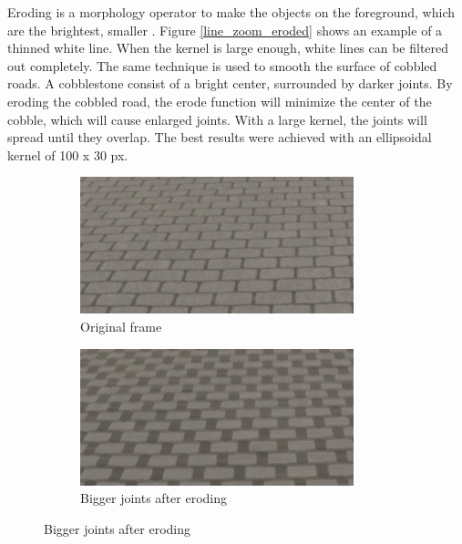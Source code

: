 \documentclass[runningheads,a4paper]{llncs}
\begin{document}
Eroding is a morphology operator to make the objects on the foreground, which are the brightest, smaller \cite{erode_dilate}. Figure \ref{line_zoom_eroded} shows an example of a thinned white line. When the kernel is large enough, white lines can be filtered out completely. The same technique is used to smooth the surface of cobbled roads. A cobblestone consist of a bright center, surrounded by darker joints. By eroding the cobbled road, the erode function will minimize the center of the cobble, which will cause enlarged joints. With a large kernel, the joints will spread until they overlap. The best results were achieved with an ellipsoidal kernel of 100 x 30 px.

\begin{figure}[ht]
	\begin{minipage}[t]{.45\textwidth}
		\centering
		\begin{subfigure}[t]{.5\textwidth}
		  \centering
		  \includegraphics[width=.9\textwidth]{fig/cobbles_zoom_original.png}
		  \caption{Original frame\label{cobbles_zoom_original}}
		\end{subfigure}%
		\begin{subfigure}[t]{.5\textwidth}
		  \centering
		  \includegraphics[width=.9\textwidth]{fig/cobbles_zoom_eroded.png}
		  \caption{Bigger joints after eroding\label{cobbles_zoom_eroded}}
		\end{subfigure}

\end{minipage}
\end{figure}
\end{document}
